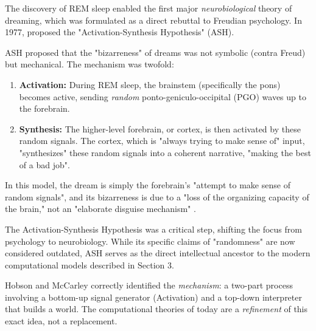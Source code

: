 The discovery of REM sleep enabled the first major \textit{neurobiological} theory of dreaming, which was formulated as a direct rebuttal to Freudian psychology. In 1977, \citet{hobson1977activation} proposed the "Activation-Synthesis Hypothesis" (ASH).

ASH proposed that the "bizarreness" of dreams was not symbolic (contra Freud) but mechanical. The mechanism was twofold:
\begin{enumerate}
    \item \textbf{Activation:} During REM sleep, the brainstem (specifically the pons) becomes active, sending \textit{random} ponto-geniculo-occipital (PGO) waves up to the forebrain.
    \item \textbf{Synthesis:} The higher-level forebrain, or cortex, is then activated by these random signals. The cortex, which is "always trying to make sense of" input, "synthesizes" these random signals into a coherent narrative, "making the best of a bad job".
\end{enumerate}

In this model, the dream is simply the forebrain's "attempt to make sense of random signals", and its bizarreness is due to a "loss of the organizing capacity of the brain," not an "elaborate disguise mechanism" \citep{hobson1977activation}.

The Activation-Synthesis Hypothesis was a critical step, shifting the focus from psychology to neurobiology. While its specific claims of "randomness" are now considered outdated, ASH serves as the direct intellectual ancestor to the modern computational models described in Section 3.

Hobson and McCarley correctly identified the \textit{mechanism}: a two-part process involving a bottom-up signal generator (Activation) and a top-down interpreter that builds a world. The computational theories of today are a \textit{refinement} of this exact idea, not a replacement.